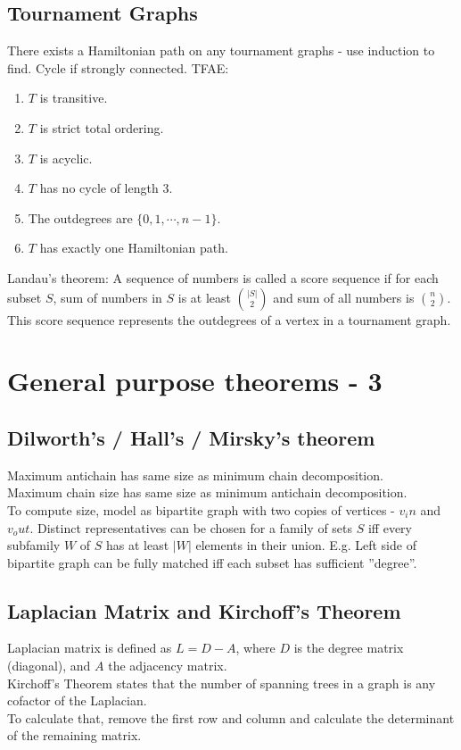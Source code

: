     \subsection{Tournament Graphs}
    There exists a Hamiltonian path on any tournament graphs - use induction to find. Cycle if strongly connected. TFAE:
    \begin{enumerate}
      \item
      $T$ is transitive.
      \item
      $T$ is strict total ordering.
      \item
      $T$ is acyclic.
      \item
      $T$ has no cycle of length $3$.
      \item
      The outdegrees are $\{0, 1, \cdots, n-1\}$.
      \item
      $T$ has exactly one Hamiltonian path.
    \end{enumerate}
    Landau's theorem: A sequence of numbers is called a score sequence if for each subset $S$, sum of 
    numbers in $S$ is at least $\binom{|S|}{2}$ and sum of all numbers is $\binom{n}{2}$.\\
    This score sequence represents the outdegrees of a vertex in a tournament graph.

 \section{General purpose theorems - 3}

    \subsection{Dilworth's / Hall's / Mirsky's theorem}
    Maximum antichain has same size as minimum chain decomposition.\\
    Maximum chain size has same size as minimum antichain decomposition.\\
    To compute size, model as bipartite graph with two copies of vertices - $v_in$ and $v_out$.
    Distinct representatives can be chosen for a family of sets $S$ iff every subfamily $W$ of $S$ has at least $|W|$
    elements in their union. E.g. Left side of bipartite graph can be fully matched iff each subset has sufficient ”degree”.

    \subsection{Laplacian Matrix and Kirchoff’s Theorem}

    Laplacian matrix is defined as $L = D - A$, where $D$ is the degree matrix (diagonal), and $A$ the adjacency matrix.\\
    Kirchoff’s Theorem states that the number of spanning trees in a graph is any cofactor of the Laplacian.\\
    To calculate that, remove the first row and column and calculate the determinant of the remaining matrix.




